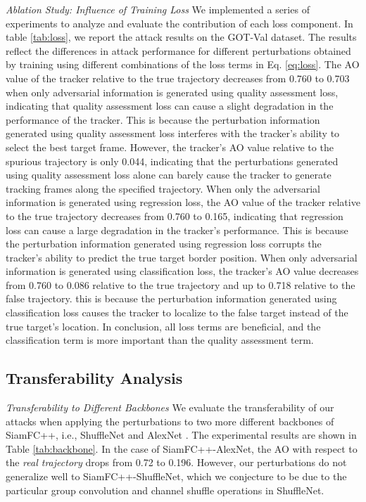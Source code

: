 \documentclass[journal]{IEEEtran}
\newcommand{\ie}{i.e.}
\begin{document}
\textit{Ablation Study: Influence of Training Loss} We implemented a series of experiments to analyze and evaluate the contribution of each loss component.
In table \ref{tab:loss}, we report the attack results on the GOT-Val dataset. The results reflect the differences in attack performance for different perturbations obtained by training using different combinations of the loss terms in Eq. \ref{eq:loss}.
The AO value of the tracker relative to the true trajectory decreases from 0.760 to 0.703 when only adversarial information is generated using quality assessment loss, indicating that quality assessment loss can cause a slight degradation in the performance of the tracker. This is because the perturbation information generated using quality assessment loss interferes with the tracker's ability to select the best target frame.
However, the tracker's AO value relative to the spurious trajectory is only 0.044, indicating that the perturbations generated using quality assessment loss alone can barely cause the tracker to generate tracking frames along the specified trajectory.
When only the adversarial information is generated using regression loss, the AO value of the tracker relative to the true trajectory decreases from 0.760 to 0.165, indicating that regression loss can cause a large degradation in the tracker's performance. This is because the perturbation information generated using regression loss corrupts the tracker's ability to predict the true target border position.
When only adversarial information is generated using classification loss, the tracker's AO value decreases from 0.760 to 0.086 relative to the true trajectory and up to 0.718 relative to the false trajectory. this is because the perturbation information generated using classification loss causes the tracker to localize to the false target instead of the true target's location.
In conclusion, all loss terms are beneficial, and the classification term is more important than the quality assessment term.

\subsection{Transferability Analysis}

\textit{Transferability to Different Backbones} We evaluate the transferability of our attacks when applying the perturbations to two more different backbones of SiamFC++, \ie, ShuffleNet \cite{ShuffleNet} and AlexNet \cite{AlexNet}.
The experimental results are shown in Table \ref{tab:backbone}. In the case of SiamFC++-AlexNet, the AO with respect to the \textit{real trajectory} drops from 0.72 to 0.196. However, our perturbations do not generalize well to SiamFC++-ShuffleNet, which we conjecture to be due to the particular group convolution and channel shuffle operations in ShuffleNet.
\end{document}
